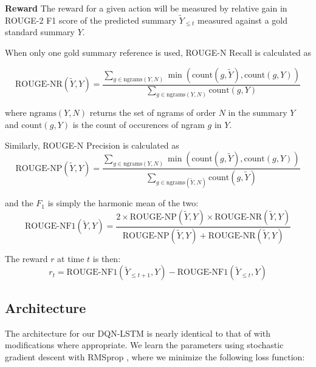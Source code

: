 \documentclass[12pt]{article}
\begin{document}
    \textbf{Reward} 
    The reward for a given action will be measured by relative gain in 
    ROUGE-2 F1 score of the predicted summary $\tilde{Y}_{\le t}$ measured
    against a gold standard summary $Y$.


     
    When only one gold summary reference is used, ROUGE-N Recall is calculated
    as 

    \[ \textrm{ROUGE-NR}(\tilde{Y}, Y) = 
        \frac{\sum_{g \in \textrm{ngrams}(Y,N)} 
        \min \left(\textrm{count}(g, \tilde{Y}), \textrm{count}(g, Y)\right)}{
        \sum_{g \in \textrm{ngrams}(Y,N)} 
        \textrm{count}(g, Y)
        }
    \]

    where $\textrm{ngrams}(Y, N)$ returns the set of ngrams of order $N$ in 
    the summary $Y$ and $\textrm{count}(g, Y)$ is the count of occurences of
    ngram $g$ in $Y.$

    Similarly, ROUGE-N Precision is calculated as 
    \[ \textrm{ROUGE-NP}(\tilde{Y}, Y) = 
        \frac{\sum_{g \in \textrm{ngrams}(Y,N)} 
        \min \left(\textrm{count}(g, \tilde{Y}), \textrm{count}(g, Y)\right)}{
            \sum_{g \in \textrm{ngrams}(\tilde{Y},N)} 
            \textrm{count}(g, \tilde{Y})
        }
    \]

    and the $F_1$ is simply the harmonic mean of the two:
    \[ \textrm{ROUGE-NF1}(\tilde{Y}, Y) = \frac{ 2 \times 
    \textrm{ROUGE-NP}(\tilde{Y}, Y) \times \textrm{ROUGE-NR}(\tilde{Y}, Y)
    }{ \textrm{ROUGE-NP}(\tilde{Y}, Y) + \textrm{ROUGE-NR}(\tilde{Y}, Y) } \]
        


    The reward $r$ at time $t$ is then:
    \[ r_t = \textrm{ROUGE-NF1}(\tilde{Y}_{\le t+1}, Y) - 
    \textrm{ROUGE-NF1}(\tilde{Y}_{\le t}, Y) \]


\subsection{Architecture}

The architecture for our DQN-LSTM is nearly identical to that of  \cite{narasimhan2015language} with modifications where appropriate. We learn the parameters using stochastic gradient descent with RMSprop \cite{hinton2012lecture}, where we minimize the following loss function: 
\end{document}
